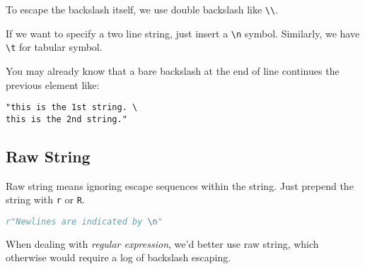To escape the backslash itself, we use double backslash like
\verb|\\|.

If we want to specify a two line string, just insert a \verb|\n|
symbol. Similarly, we have \verb|\t| for tabular symbol.

You may already know that a bare backslash at the end of line
continues the previous element like:

\begin{lstlisting}
"this is the 1st string. \
this is the 2nd string."
\end{lstlisting}

\subsection{Raw String}
\label{sec:py-raw-string}

Raw string means ignoring escape sequences within the string. Just
prepend the string with \verb|r| or \verb|R|.

\begin{lstlisting}[language=python,caption={Raw String},label={lst:raw-string}]
r"Newlines are indicated by \n"
\end{lstlisting}

When dealing with \textit{regular expression}, we'd better use raw
string, which otherwise would require a log of backslash escaping.

